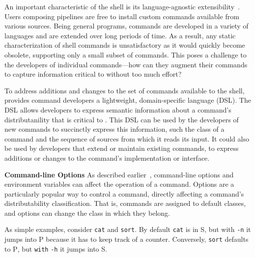 \documentclass[sigplan,10pt,review,anonymous]{acmart}
\newcommand{\heading}[1]{\vspace{4pt}\noindent\textbf{#1}\enspace}
\newcommand{\ttt}[1]{\texttt{\small #1}}
\newcommand{\cn}[1]{\mbox{\textcircled{\footnotesize #1}}}
\newcommand{\pur}{\cn{\textsc{P}}\xspace}
\newcommand{\sta}{\cn{\textsc{S}}\xspace}
\newcommand{\nv}[1]{[{\color{cyan}#1 --- Nikos}]}
\newcommand{\kk}[1]{[{\color{magenta}#1 --- kk}]}
\begin{document}
An important characteristic of the \unix shell is its language-agnostic extensibility~.
Users composing pipelines are free to install custom commands available from various sources.
Being general programs, commands are developed in a variety of languages and are extended over long periods of time.
As a result, any static characterization of shell commands is unsatisfactory as it would quickly become obsolete, supporting only a small subset of commands.
This poses a challenge to the developers of individual commands---how can they augment their commands to capture information critical to \sys without too much effort?

To address additions and changes to the set of commands available to the shell, \sys provides command developers a lightweight, domain-specific language (DSL).
The DSL allows developers to express semantic information about a command's distributanility that is critical to \sys.
This DSL can be used by the developers of new commands to succinctly express this information, such the class of a command and the sequence of sources from which it reads its input.
It could also be used by developers that extend or maintain existing commands, to express additions or changes to the command's implementation or interface.

\heading{Command-line Options}
As described earlier~, command-line options and environment variables can affect the operation of a command.
Options are a particularly popular way to control a command, 
  directly affecting a command's distributability classification.
That is, commands are assigned to default classes, and options can change the class in which they belong.

As simple examples, consider \ttt{cat} and \ttt{sort}.
By default \ttt{cat} is in \sta, but with \ttt{-n} it jumps into \pur because it has to keep track of a counter.
Conversely, \ttt{sort} defaults to \pur, but \ttt{with} \ttt{-h} it jumps into \sta.

\end{document}
